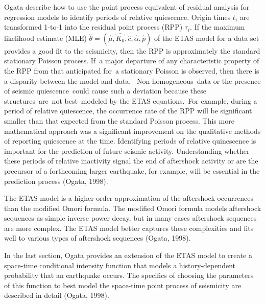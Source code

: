 \documentclass[12pt]{article} %
\theoremstyle{plain}
\begin{document}
	
	Ogata describe how to use the point process equivalent of residual analysis for regression models to identify periods of relative quiescence. Origin times ${t_i}$ are transformed 1-to-1 into the residual point process (RPP) ${\tau_i}$. If the maximum likelihood estimate (MLE) $\hat{\theta} =(\hat{\mu}, \hat{K_0}, \hat{c}, \hat{\alpha}, \hat{p})$ of the ETAS model for a data set provides a good fit to the seismicity, then the RPP is approximately the standard stationary Poisson process. If a major departure of any characteristic property of the RPP from that anticipated for a stationary Poisson is observed, then there is a disparity between the model and data.  Non-homogeneous data or the presence of seismic quiescence could cause such a deviation because these structures are not best modeled by the ETAS equations. For example, during a period of relative quiescence, the occurrence rate of the RPP will be significant smaller than that expected from the standard Poisson process. This more mathematical approach was a significant improvement on the qualitative methods of reporting quiescence at the time. Identifying periods of relative quinescence is important for the prediction of future seismic activity. Understanding whether these periods of relative inactivity signal the end of aftershock activity or are the precursor of a forthcoming larger earthquake, for example, will be essential in the prediction process (Ogata, 1998). 
	
	The ETAS model is a higher-order approximation of the aftershock occurrences than the modified Omori formula. The modified Omori formula models aftershock sequences as simple inverse power decay, but in many cases aftershock sequences are more complex. The ETAS model better captures these complexities and fits well to various types of aftershock sequences (Ogata, 1998). 
	
	In the last section, Ogata provides an extension of the ETAS model to create a space-time conditional intensity function that models a history-dependent probability that an earthquake occurs. The specifics of choosing the parameters of this function to best model the space-time point process of seismicity are described in detail (Ogata, 1998). 
	
\end{document}
